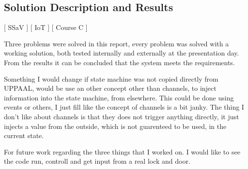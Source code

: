 \subsection{Solution Description and Results}
[ SSaV ] [ IoT ] [ Course C ] 
\newline

Three problems were solved in this report, every problem was solved with a working solution, both tested internally and externally at the presentation day.
From the results it can be concluded that the system meets the requirements.

Something I would change if state machine was not copied directly from UPPAAL, would be use an other concept other than channels, to inject information into the state machine, from elsewhere.
This could be done using events or others, I just fill like the concept of channels is a bit janky.
The thing I don't like about channels is that they does not trigger anything directly, it just injects a value from the outside, which is not guarenteed to be used, in the current state.

For future work regarding the three things that I worked on.
I would like to see the code run, controll and get input from a real lock and door.